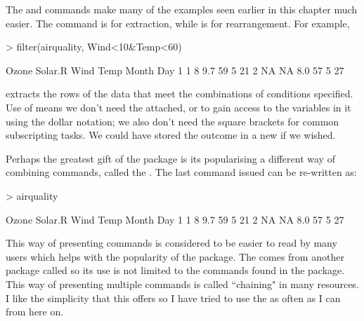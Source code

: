 The  and  commands make many of the examples seen earlier in this chapter much easier. The  command is for extraction, while  is for rearrangement. For example, 
\begin{Schunk}
\begin{Sinput}
> filter(airquality, Wind<10&Temp<60) 
\end{Sinput}
\begin{Soutput}
  Ozone Solar.R Wind Temp Month Day
1     1       8  9.7   59     5  21
2    NA      NA  8.0   57     5  27
\end{Soutput}
\end{Schunk}
extracts the rows of the  data that meet the combinations of conditions specified.  
Use of  means we don't need the  attached, or to gain access to the variables in it using the dollar notation; we also don't need the square brackets for common subscripting tasks. We could have stored the outcome in a new  if we wished. 
 
Perhaps the greatest gift of the  package is its popularising a different way of combining commands, called the . The last command issued can be re-written as: 
\begin{Schunk}
\begin{Sinput}
> airquality %>% filter(Wind<10&Temp<60) 
\end{Sinput}
\begin{Soutput}
  Ozone Solar.R Wind Temp Month Day
1     1       8  9.7   59     5  21
2    NA      NA  8.0   57     5  27
\end{Soutput}
\end{Schunk}
This way of presenting commands is considered to be easier to read by many users which helps with the popularity of the   package. The  comes from another package called  so its use is not limited to the commands found in the  package.  
This way of presenting multiple commands is called ``chaining" in many resources. I like the simplicity that this offers so I have tried to use the  as often as I can from here on. 
  
